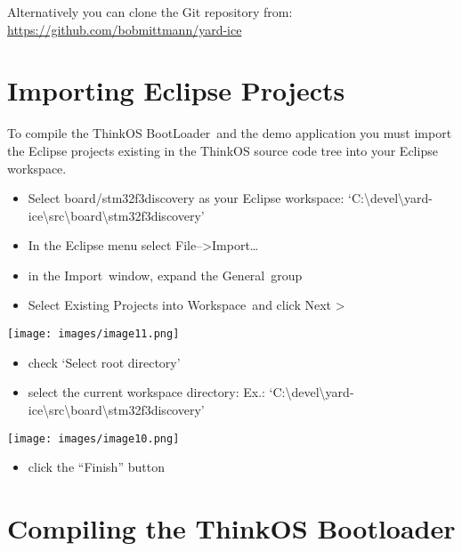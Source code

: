 {Alternatively you can clone the Git repository from:
}{\href{https://www.google.com/url?q=https://github.com/bobmittmann/yard-ice\&sa=D\&ust=1511275046380000\&usg=AFQjCNFusJgGgAORHVsXadKiiwWkzF5HBQ}{https://github.com/bobmittmann/yard-ice}}

\hypertarget{h.17dp8vu}{\section{\texorpdfstring{{Importing Eclipse
Projects}}{Importing Eclipse Projects}}\label{h.17dp8vu}}

{To compile the }{ThinkOS BootLoader}{~and the demo application you must
import the Eclipse projects existing in the ThinkOS source code tree
into your Eclipse workspace.}

\begin{itemize}
\tightlist
\item
  {Select }{board/stm32f3discovery }{as your Eclipse workspace:
  `}{C:\textbackslash{}devel\textbackslash{}yard-ice\textbackslash{}src\textbackslash{}board\textbackslash{}stm32f3discovery}{'}
\item
  {In the Eclipse menu select }{File--\textgreater{}Import\ldots{}}
\item
  {in the }{Import}{~window, expand the }{General}{~group}
\item
  {Select }{Existing Projects into Workspace}{~and click }{Next
  \textgreater{}}
\end{itemize}

{\texttt{[image: images/image11.png]}}

\begin{itemize}
\tightlist
\item
  {check `}{Select root directory}{'}
\item
  {select the current workspace directory: Ex.:
  `}{C:\textbackslash{}devel\textbackslash{}yard-ice\textbackslash{}src\textbackslash{}board\textbackslash{}stm32f3discovery}{'}
\end{itemize}

{\texttt{[image: images/image10.png]}}

\begin{itemize}
\tightlist
\item
  {click the ``Finish'' button }
\end{itemize}

\hypertarget{h.3rdcrjn}{\section{\texorpdfstring{{Compiling the ThinkOS
Bootloader}}{Compiling the ThinkOS Bootloader}}\label{h.3rdcrjn}}

